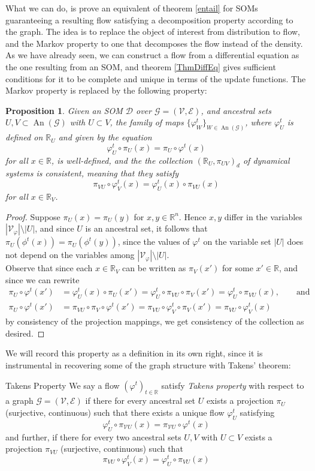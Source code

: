 \documentclass[11pt, a4paper]{memoir}
\theoremstyle{break}
\newtheorem{prop}{Proposition}
\theoremstyle{break}
\theoremstyle{nonumberplain}
\newtheorem{proof}{Proof}
\newcommand{\mR}{\mathbb{R}}
\DeclareMathOperator{\an}{An}
\begin{document}
What we can do, is prove an equivalent of theorem \ref{entail} for SOMs guaranteeing a resulting flow satisfying a decomposition property according to the graph. The idea is to replace the object of interest from distribution to flow, and the Markov property to one that decomposes the flow instead of the density. As we have already seen, we can construct a flow from a differential equation as the one resulting from an SOM, and theorem \ref{ThmDiffEq} gives sufficient conditions for it to be complete and unique in terms of the update functions. The Markov property is replaced by the following property:
\begin{prop}
Given an SOM $\mathcal{D}$ over $\mathcal{G}=(\mathcal{V},\mathcal{E})$, and ancestral sets $U,V\subset \an(\mathcal{G})$ with $U\subset V$, the family of maps $\{\varphi^t_W\}_{W\in \an(\mathcal{G})}$, where $\varphi_U^t$ is defined on $\mR_U$ and given by the equation
$$\varphi^t_U\circ\pi_U(x)=\pi_U\circ \varphi^t(x)$$
for all $x\in \mR$, is well-defined, and the the collection $(\mR_U,\pi_{UV})_{d}$ of dynamical systems is consistent, meaning that they satisfy
$$\pi_{VU}\circ \varphi_V^t(x)=\varphi_U^t(x)\circ\pi_{VU}(x)$$
for all $x\in \mR_V$.
\end{prop}
\begin{proof}
Suppose $\pi_U(x)=\pi_U(y)$ for $x,y\in \mR^n$. Hence $x,y$ differ in the variables $|\mathcal{V}_\varphi|\setminus |U|$, and since $U$ is an ancestral set, it follows that $\pi_U(\phi^t(x))=\pi_U(\phi^t(y))$, since the values of $\varphi^t$ on the variable set $|U|$ does not depend on the variables  among $|\mathcal{V}_\varphi|\setminus |U|$.\\
Observe that since each $x\in \mR_V$ can be written as $\pi_V(x')$ for some $x'\in \mR$, and since we can rewrite
\begin{align*}
\pi_U\circ\varphi^t(x')
&=\varphi_U^t(x)\circ\pi_U(x')=
\varphi_U^t\circ\pi_{VU}\circ\pi_V(x')=\varphi_U^t\circ\pi_{VU}(x),\quad\quad \text{and}\\
\pi_U\circ\varphi^t(x')&=\pi_{VU}\circ \pi_V\circ\varphi^t(x')=\pi_{VU}\circ \varphi_V^t\circ \pi_V(x')=\pi_{VU}\circ\varphi_V^t(x)
\end{align*}
by consistency of the projection mappings, we get consistency of the collection as desired.
\end{proof}
We will record this property as a definition in its own right, since it is instrumental in recovering some of the graph structure with Takens' theorem:
\begin{mydefinition}{Takens Property}
We say a flow $(\varphi^t)_{t\in \mR}$ satisfy \emph{Takens property} with respect to a graph $\mathcal{G}=(\mathcal{V},\mathcal{E})$ if there for every ancestral set $U$ exists a projection $\pi_{U}$ (surjective, continuous) such that there exists a unique flow $\varphi^t_U$ satisfying
$$\varphi^t_{U}\circ \pi_{\mathcal{V}U}(x)=\pi_{\mathcal{V}U}\circ \varphi^t(x)$$
and further, if there for every two ancestral sets $U,V$ with $U\subset V$ exists a projection $\pi_{VU}$ (surjective, continuous) such that
$$\pi_{VU}\circ\varphi_V^t(x)=\varphi_U^t\circ \pi_{VU}(x)$$
\end{mydefinition}
\end{document}
